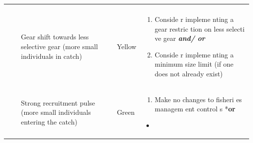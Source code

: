 \documentclass[]{book}
\providecommand{\tightlist}{%
  \setlength{\itemsep}{0pt}\setlength{\parskip}{0pt}}
\begin{document}
\begin{longtable}[]{@{}lllll@{}}
\begin{minipage}[t]{0.19\columnwidth}
\end{minipage}\tabularnewline
\begin{minipage}[t]{0.19\columnwidth}\raggedright\strut
\strut
\end{minipage} & \begin{minipage}[t]{0.19\columnwidth}\raggedright\strut
\strut
\end{minipage} & \begin{minipage}[t]{0.19\columnwidth}\raggedright\strut
Gear shift towards less selective gear (more small individuals in
catch)\strut
\end{minipage} & \begin{minipage}[t]{0.19\columnwidth}\raggedright\strut
Yellow\strut
\end{minipage} & \begin{minipage}[t]{0.19\columnwidth}\raggedright\strut
\begin{enumerate}
\def\labelenumi{\arabic{enumi}.}
\item
  Conside r impleme nting a gear restric tion on less selecti ve gear
  \textbf{\emph{and/ or}}
\item
  Conside r impleme nting a minimum size limit (if one does not already
  exist)
\end{enumerate}\strut
\end{minipage}\tabularnewline
\begin{minipage}[t]{0.19\columnwidth}\raggedright\strut
\strut
\end{minipage} & \begin{minipage}[t]{0.19\columnwidth}\raggedright\strut
\strut
\end{minipage} & \begin{minipage}[t]{0.19\columnwidth}\raggedright\strut
Strong recruitment pulse (more small individuals entering the
catch)\strut
\end{minipage} & \begin{minipage}[t]{0.19\columnwidth}\raggedright\strut
Green\strut
\end{minipage} & \begin{minipage}[t]{0.19\columnwidth}\raggedright\strut
\begin{enumerate}
\def\labelenumi{\arabic{enumi}.}
\tightlist
\item
  Make no changes to fisheri es managem ent control s *\textbf{or}
\end{enumerate}

\begin{itemize}
\item
\end{itemize}


\end{minipage}
\end{longtable}
\end{document}
